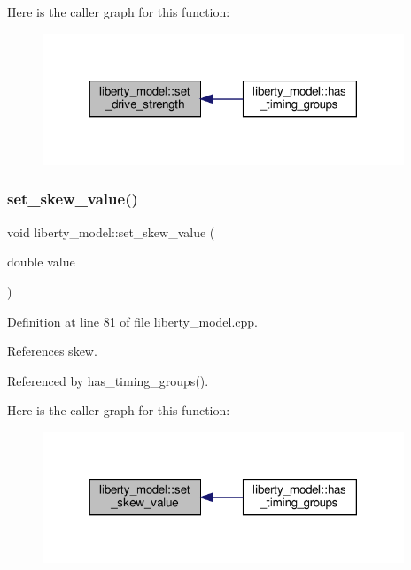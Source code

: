 Here is the caller graph for this function\+:
\nopagebreak
\begin{figure}[H]
\begin{center}
\leavevmode
\includegraphics[width=306pt]{d0/dae/classliberty__model_a7733787e96dda82f8b979f6d8d384e70_icgraph}
\end{center}
\end{figure}
\mbox{\label{classliberty__model_a3a8b190bacc727338344db57a5916329}} 
\subsubsection{\texorpdfstring{set\+\_\+skew\+\_\+value()}{set\_skew\_value()}}
{\footnotesize\ttfamily void liberty\+\_\+model\+::set\+\_\+skew\+\_\+value (\begin{DoxyParamCaption}\item[{double}]{value }\end{DoxyParamCaption})}



Definition at line 81 of file liberty\+\_\+model.\+cpp.



References skew.



Referenced by has\+\_\+timing\+\_\+groups().

Here is the caller graph for this function\+:
\nopagebreak
\begin{figure}[H]
\begin{center}
\leavevmode
\includegraphics[width=306pt]{d0/dae/classliberty__model_a3a8b190bacc727338344db57a5916329_icgraph}
\end{center}
\end{figure}
\mbox{\label{classliberty__model_a2ee7986501fabaf63a98e36e3462b034}} 
